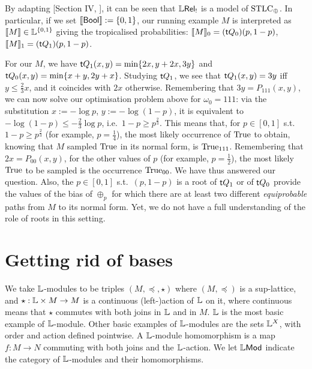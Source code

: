 \documentclass[submission,%
]{eptcs}
\begin{document}
\begin{remark}
 By adapting [Section IV, \cite{Manzo2013}], it can be seen that $\mathbb{L} \mathsf{Rel}_!$ is a model of $\mathrm{STLC}_\oplus$.
 In particular, if we set $\llbracket\mathsf{Bool}\rrbracket:=\{0,1\}$, our running example $M$ is interpreted as $\llbracket M\rrbracket\in\mathbb{L}^{\{0,1\}}$ giving the tropicalised probabilities: $\llbracket M\rrbracket_0=(\mathsf{t} Q_0)(p,1-p)$, $\llbracket M\rrbracket_1=(\mathsf{t} Q_1)(p,1-p)$.
\end{remark}


For our $M$, we have $\mathsf{t} Q_1(x,y)=\min\{2x,y+2x,3y\}$ and $\mathsf{t} Q_0(x,y)=\min\{x+y,2y+x\}$.
Studying $\mathsf{t} Q_1$, we see that $\mathsf{t} Q_1(x,y)=3y$ iff $y\leq \frac{2}{3}x$, and it coincides with $2x$ otherwise.
Remembering that $3y=P_{111}(x,y)$, we can now solve our optimisation problem above for $\omega_0=111$:
via the substitution $x:=-\log p$, $y:=-\log (1-p)$, it is equivalent to $-\log (1-p)\leq -\frac{2}{3}\log p$, i.e.\ $1-p\geq p^{\frac{2}{3}}$.
This means that, for $p\in[0,1]$ s.t.\ $1-p\geq p^{\frac{2}{3}}$ (for example, $p=\frac{1}{4}$), the most likely occurrence of $\mathrm{True}$ to obtain, knowing that $M$ sampled $\mathrm{True}$ in its normal form, is $\mathrm{True}_{111}$.
Remembering that $2x=P_{00}(x,y)$, for the other values of $p$ (for example, $p=\frac{1}{2}$), the most likely $\mathrm{True}$ to be sampled is the occurrence $\mathrm{True}_{00}$.
We have thus answered our question.
Also, the $p\in[0,1]$ s.t.\ $(p,1-p)$ is a root of $\mathsf{t} Q_1$ or of $\mathsf{t} Q_0$ provide the values of the bias of $\oplus_p$ for which there are at least two different \emph{equiprobable} paths from $M$ to its normal form.
Yet, we do not have a full understanding of the role of roots in this setting.


\section{Getting rid of bases}

We take $\mathbb{L}$-modules to be triples $(M,\preceq, \star)$ where $(M, \preceq)$ is a sup-lattice, and $\star: \mathbb{L} \times M \to M$ is a continuous (left-)action of $\mathbb{L}$ on it, where continuous means that $\star$ commutes with both joins in $\mathbb{L}$ and in $M$.%
$\mathbb{L}$ is the most basic example of $\mathbb{L}$-module.
 Other basic examples of $\mathbb{L}$-modules are the sets $\mathbb{L}^{X}$, with order and action defined pointwise. 
A $\mathbb{L}$-module homomorphism is a map $f:M\to N$ commuting with both joins and the $\mathbb{L}$-action. We let $\mathbb{L}\mathsf{Mod}$ indicate the category of $\mathbb{L}$-modules and their homomorphisms. 
\end{document}
